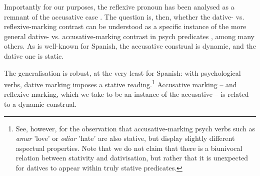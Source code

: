 \documentclass[output=paper,colorlinks,citecolor=brown,nonflat]{./langscibook}
\begin{document}
\ea%
    \label{ex:fabregas:6}
    \z
\z

Importantly for our purposes, the reflexive pronoun has been analysed as a remnant of the accusative case \citep{Medová2009}. The question is, then, whether the dative- vs. reflexive-marking contrast can be understood as a specific instance of the more general dative- vs. accusative-marking contrast in psych predicates \citep{FernándezOrdóñez1999, Landau2010, CifuentesHonrubia2015, FábregasJiménezFernándezTubinoBlanco2017}, among many others. As is well-known for Spanish, the accusative construal is dynamic, and the dative one is static.

\ea%
    \label{ex:fabregas:7}
    \z
\z

\ea%
    \label{ex:fabregas:8}
    \z
\z

The generalisation is robust, at the very least for Spanish: with psychological verbs, dative marking imposes a stative reading.\footnote{See, however, \citet{FábregasMarín2015} for the observation that accusative-marking psych verbs such as \textit{amar} 'love' or \textit{odiar} 'hate' are also stative, but display slightly different aspectual properties. Note that we do not claim that there is a biunivocal relation between stativity and dativisation, but rather that it is unexpected for datives to appear within truly stative predicates.} Accusative marking – and reflexive marking, which we take to be an instance of the accusative – is related to a dynamic construal. 
\end{document}
